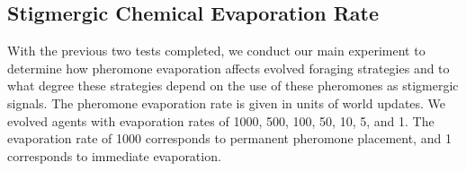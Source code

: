 \subsection*{Stigmergic Chemical Evaporation Rate}

With the previous two tests completed, we conduct our main experiment to determine how pheromone evaporation affects evolved foraging strategies and to what degree these strategies depend on the use of these pheromones as stigmergic signals. The pheromone evaporation rate is given in units of world updates. We evolved agents with evaporation rates of 1000, 500, 100, 50, 10, 5, and 1. The evaporation rate of 1000 corresponds to permanent pheromone placement, and 1 corresponds to immediate evaporation.